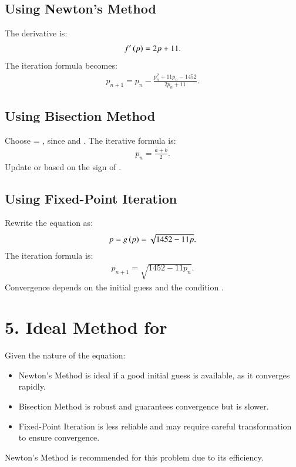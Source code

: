\documentclass[journal]{IEEEtran}
\begin{document}
\subsection*{Using Newton's Method}
The derivative is:
\begin{align}
    f'\left(p\right) = 2p + 11.
\end{align}
The iteration formula becomes:
\begin{align}
    p_{n+1} = p_n - \frac{p_n^2 + 11p_n - 1452}{2p_n + 11}.
\end{align}

\subsection*{Using Bisection Method}
Choose  = , since  and . The iterative formula is:
\begin{align}
    p_{n} = \frac{a + b}{2}.
\end{align}
Update  or  based on the sign of .

\subsection*{Using Fixed-Point Iteration}
Rewrite the equation as:
\begin{align}
    p = g\left(p\right) = \sqrt{1452 - 11p}.
\end{align}
The iteration formula is:
\begin{align}
    p_{n+1} = \sqrt{1452 - 11p_n}.
\end{align}
Convergence depends on the initial guess and the condition .

\section*{5. Ideal Method for }
Given the nature of the equation:
\begin{itemize}
    \item Newton's Method is ideal if a good initial guess is available, as it converges rapidly.
    \item Bisection Method is robust and guarantees convergence but is slower.
    \item Fixed-Point Iteration is less reliable and may require careful transformation to ensure convergence.
\end{itemize}
Newton's Method is recommended for this problem due to its efficiency.
\end{document}
